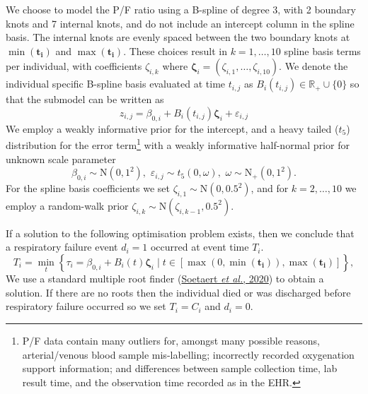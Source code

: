 \documentclass[
  10pt,
  a4paper,
]{article}
\begin{document}
We choose to model the P/F ratio using a B-spline of degree 3, with 2
boundary knots and 7 internal knots, and do not include an intercept
column in the spline basis. The internal knots are evenly spaced between
the two boundary knots at \(\min(\boldsymbol{t_{i}})\) and
\(\max(\boldsymbol{t_{i}})\). These choices result in
\(k = 1, \ldots, 10\) spline basis terms per individual, with
coefficients \(\zeta_{i, k}\) where
\(\boldsymbol{\zeta}_{i} = (\zeta_{i, 1}, \ldots, \zeta_{i, 10})\). We
denote the individual specific B-spline basis evaluated at time
\(t_{i, j}\) as \(B_{i}(t_{i, j}) \in \mathbb{R}_{+} \cup \{0\}\) so
that the submodel can be written as \begin{equation}
  z_{i, j} = \beta_{0, i} + B_{i}(t_{i, j})\boldsymbol{\zeta}_{i} + \varepsilon_{i, j}
\end{equation} We employ a weakly informative prior for the intercept,
and a heavy tailed (\(t_{5}\)) distribution for the error
term\footnote{P/F data contain many outliers for, amongst many possible
  reasons, arterial/venous blood sample mis-labelling; incorrectly
  recorded oxygenation support information; and differences between
  sample collection time, lab result time, and the observation time
  recorded as in the EHR.} with a weakly informative half-normal prior
for unknown scale parameter \begin{equation}
  \beta_{0, i} \sim \text{N}(0, 1^2), \,\, \varepsilon_{i, j} \sim t_{5}(0, \omega), \,\,  \omega \sim \text{N}_{+}(0, 1^2).
\end{equation} For the spline basis coefficients we set
\(\zeta_{i, 1} \sim \text{N}(0, 0.5^2)\), and for \(k = 2, \ldots, 10\)
we employ a random-walk prior
\(\zeta_{i, k} \sim \text{N}(\zeta_{i, k - 1}, 0.5^2)\).

If a solution to the following optimisation problem exists, then we
conclude that a respiratory failure event \(d_{i} = 1\) occurred at
event time \(T_{i}\). \begin{equation}
  T_{i} = \min_{t} \left\{
    \tau_{i} = \beta_{0, i} + B_{i}(t)\boldsymbol{\zeta}_{i}
    \mid
    t \in [\max(0, \min(\boldsymbol{t_{i}})), \max(\boldsymbol{t_{i}})]
  \right\},
  \label{eqn:event_time_model_def}
\end{equation} We use a standard multiple root finder
(\protect\hyperlink{ref-soetaert_rootsolve_2020}{Soetaert \emph{et al.},
2020}) to obtain a solution. If there are no roots then the individual
died or was discharged before respiratory failure occurred so we set
\(T_{i} = C_{i}\) and \(d_{i} = 0\).
\end{document}
